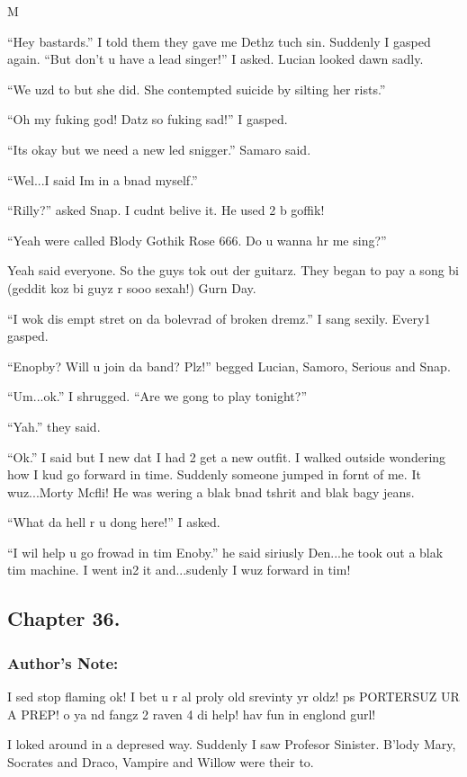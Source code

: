 M\documentclass{article}
\begin{document}
“Hey bastards.” I told them they gave me Dethz tuch sin. Suddenly I gasped again. “But don’t u have a lead singer!” I asked. Lucian looked dawn sadly.

“We uzd to but she did. She contempted suicide by silting her rists.”

“Oh my fuking god! Datz so fuking sad!” I gasped.

“Its okay but we need a new led snigger.” Samaro said.

“Wel...I said Im in a bnad myself.”

“Rilly?” asked Snap. I cudnt belive it. He used 2 b goffik!

“Yeah were called Blody Gothik Rose 666. Do u wanna hr me sing?”

Yeah said everyone. So the guys tok out der guitarz. They began to pay a song bi (geddit koz bi guyz r sooo sexah!) Gurn Day.

“I wok dis empt stret on da bolevrad of broken dremz.” I sang sexily. Every1 gasped.

“Enopby? Will u join da band? Plz!” begged Lucian, Samoro, Serious and Snap.

“Um...ok.” I shrugged. “Are we gong to play tonight?”

“Yah.” they said.

“Ok.” I said but I new dat I had 2 get a new outfit. I walked outside wondering how I kud go forward in time. Suddenly someone jumped in fornt of me. It wuz...Morty Mcfli! He was wering a blak bnad tshrit and blak bagy jeans.

“What da hell r u dong here!” I asked.

“I wil help u go frowad in tim Enoby.” he said siriusly Den...he took out a blak tim machine. I went in2 it and...sudenly I wuz forward in tim!

\clearpage\nolinenumbers
\subsection*{Chapter 36.}

\subsubsection*{Author's Note: }I sed stop flaming ok! I bet u r al proly old srevinty yr oldz! ps PORTERSUZ UR A PREP! o ya nd fangz 2 raven 4 di help! hav fun in englond gurl!

\textbreak
\linenumbers\resetlinenumber

I loked around in a depresed way. Suddenly I saw Profesor Sinister. B’lody Mary, Socrates and Draco, Vampire and Willow were their to.
\end{document}
